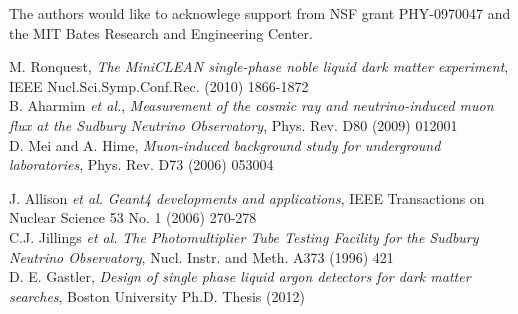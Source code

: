 \documentclass[review,number,sort&compress]{elsarticle}
\begin{document}
\acknowledgments
The authors would like to acknowlege support from NSF grant PHY-0970047 and the MIT Bates Research and Engineering Center.


\begin{thebibliography}{999}

M. Ronquest, \emph{The MiniCLEAN single-phase noble liquid dark matter experiment}, IEEE Nucl.Sci.Symp.Conf.Rec. (2010) 1866-1872 \\

B. Aharmim {\it et al.}, \emph{Measurement of the cosmic ray and neutrino-induced muon flux at the Sudbury Neutrino Observatory}, Phys. Rev. D80 (2009) 012001 \\

D. Mei and A. Hime, \emph{Muon-induced background study for underground laboratories}, Phys. Rev. D73 (2006) 053004

J. Allison {\it et al.} \emph{Geant4 developments and applications}, IEEE Transactions on Nuclear Science 53 No. 1 (2006) 270-278 \\

C.J. Jillings {\it et al.} \emph{The Photomultiplier Tube Testing Facility for the Sudbury Neutrino Observatory}, Nucl. Instr. and Meth. A373 (1996) 421 \\

	D. E. Gastler, \emph{Design of single phase liquid argon detectors for dark matter searches}, Boston University Ph.D. Thesis (2012) \\

\end{thebibliography}
\end{document}
